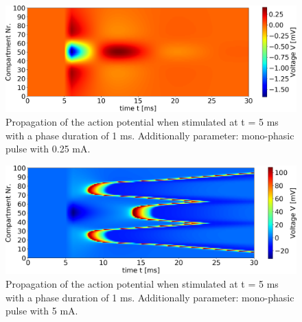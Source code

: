 \documentclass{scrartcl}			%
\begin{document}
\begin{figure}[hbpt!]					%
	\begin{flushleft}
		\hspace*{-0.3in}
		\includegraphics[scale=0.47]{3_5.png}
		\captionsetup{width=\linewidth}  %
		\caption{Propagation of the action potential when stimulated at t = 5 ms with a phase duration of 1 ms. Additionally parameter: mono-phasic pulse with 0.25 mA.}		
		\label{fig35} %
	\end{flushleft}
\end{figure}
\begin{figure}[hbpt!]					%
	\begin{flushleft}
		\hspace*{-0.3in}
		\includegraphics[scale=0.47]{3_6.png}
		\captionsetup{width=\linewidth}  %
		\caption{Propagation of the action potential when stimulated at t = 5 ms with a phase duration of 1 ms. Additionally parameter: mono-phasic pulse with 5 mA.}		
		\label{fig36} %
	\end{flushleft}
\end{figure}
\end{document}
